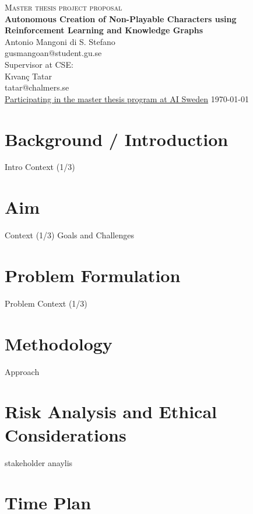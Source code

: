 \documentclass{article}
\begin{document}
\begin{titlepage}
\centering
{\scshape\LARGE Master thesis project proposal\\}
\vspace{0.5cm}  
{\huge\bfseries Autonomous Creation of Non-Playable Characters using Reinforcement Learning and Knowledge Graphs\\}  
\vspace{2cm}  
{\Large Antonio Mangoni di S. Stefano \\ gusmangoan@student.gu.se\\}  
\vspace{1.0cm}  
{\large Supervisor at CSE: \\
Kıvanç Tatar\\
tatar@chalmers.se \\}  
\vspace{1.5cm}  
{\large
\href{https://careers.ai.se/jobs/3182398-master-thesis-program-ai-sweden-and-partners}{Participating in the master thesis program at AI Sweden}}  
\vspace{1.5cm}  
\vspace{1.5cm} 
\vfill
\vfill
{\large \today\\} 
\end{titlepage}

\section{Background / Introduction}
Intro
Context (1/3)
\section{Aim}
Context (1/3)
Goals and Challenges
\section{Problem Formulation}
Problem
Context (1/3)
\section{Methodology}
Approach
\section{Risk Analysis and Ethical Considerations}
stakeholder anaylis


\section{Time Plan}
\end{document}
